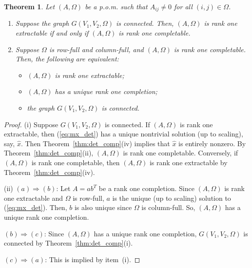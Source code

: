 \documentclass{amsart}
\newcommand{\reff}[1]{(\ref{#1})}
\newcommand{\bnum}{\begin{enumerate}}
\newcommand{\enum}{\end{enumerate}}
\newcommand{\bit}{\begin{itemize}}
\newcommand{\eit}{\end{itemize}}
\newtheorem{theorem}{Theorem}[section]
\theoremstyle{definition}
\numberwithin{equation}{section}
\begin{document}
\begin{theorem}\label{thm:connect<->rank-1}
Let $(A, \Omega)$ be a p.o.m. such that $A_{ij} \ne 0$ for all $(i,j) \in \Omega$.
\bnum

\item[(i)] Suppose the graph $G(V_1, V_2, \Omega)$ is connected. 
Then, $(A, \Omega)$ is rank one extractable if and only if $(A, \Omega)$ is rank one completable.

\item[(ii)] Suppose $\Omega$ is row-full and column-full, and
$(A, \Omega)$ is rank one completable. 
Then, the following are equivalent:
\bit
\item[(a)]  $(A, \Omega)$ is rank one extractable;

\item[(b)] $(A, \Omega)$ has a unique rank one completion;

\item[(c)] the graph $G(V_1, V_2, \Omega)$ is connected.
\eit

\enum
\end{theorem}

\begin{proof}
(i) Suppose $G(V_1, V_2, \Omega)$ is connected.
If $(A, \Omega)$ is rank one extractable, then \reff{eq:mx_det} has a unique nontrivial solution 
(up to scaling),
say, $\hat{x}$.
Then Theorem~\ref{thm:det_comp}(iv) implies that $\hat{x}$ is entirely nonzero.
By Theorem~\ref{thm:det_comp}(ii), $(A, \Omega)$ is rank one completable.
Conversely, if $(A, \Omega)$ is rank one completable, then $(A, \Omega)$ is rank one extractable by Theorem~\ref{thm:det_comp}(iv).



\noindent (ii) $(a) \Rightarrow (b)$: 
Let $A = ab^T$ be a rank one completion.
Since $(A, \Omega)$ is rank one extractable and $\Omega$ is row-full,
$a$ is the unique (up to scaling) solution to \reff{eq:mx_det}.
Then, $b$ is also unique since $\Omega$ is column-full.
So, $(A, \Omega)$ has a unique rank one completion. 


\noindent $(b) \Rightarrow (c)$: 
Since $(A, \Omega)$ has a unique rank one completion, 
$G(V_1, V_2, \Omega)$ is connected by Theorem~\ref{thm:det_comp}(i). 

\noindent $(c) \Rightarrow (a)$: This is implied by item~(i).
\end{proof}
\end{document}
